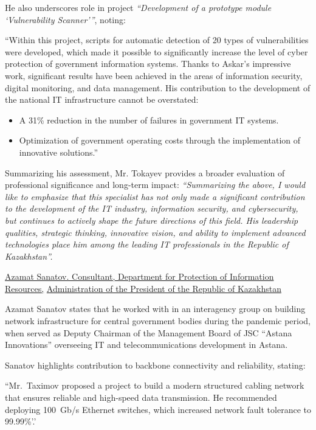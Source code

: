 He also underscores \mrls role in project \emph{``Development of a prototype module `Vulnerability Scanner'''}, noting:
\begin{fullquote}
``Within this project, scripts for automatic detection of 20 types of vulnerabilities were developed, which made it possible to significantly increase the level of cyber protection of government information systems. Thanks to Askar's impressive work, significant results have been achieved in the areas of information security, digital monitoring, and data management. His contribution to the development of the national IT infrastructure cannot be overstated:
\begin{itemize}[nosep]
\item A 31\% reduction in the number of failures in government IT systems.
\item Optimization of government operating costs through the implementation of innovative solutions.''
\end{itemize}
\end{fullquote}

Summarizing his assessment, Mr. Tokayev provides a broader evaluation of \mrls professional significance and long-term impact:
\emph{``Summarizing the above, I would like to emphasize that this specialist has not only made a significant contribution to the development of the IT industry, information security, and cybersecurity, but continues to actively shape the future directions of this field. His leadership qualities, strategic thinking, innovative vision, and ability to implement advanced technologies place him among the leading IT professionals in the Republic of Kazakhstan''.}  


\bigskip
\noindent\underline{Azamat Sanatov. Consultant, Department for Protection of Information Resources,}
\noindent\underline{Administration of the President of the Republic of Kazakhstan}

Azamat Sanatov states that he worked with \mrl{} in an interagency group on building network infrastructure for central government bodies during the pandemic period, when \mrl{} served as Deputy Chairman of the Management Board of JSC ``Astana Innovations'' overseeing IT and telecommunications development in Astana.

Sanatov highlights \mrls contribution to backbone connectivity and reliability, stating:
\begin{fullquote}
``Mr.\ Taximov proposed a project to build a modern structured cabling network that ensures reliable and high-speed data transmission. He recommended deploying 100~Gb/s Ethernet switches, which increased network fault tolerance to 99.99\%'.'
\end{fullquote}


